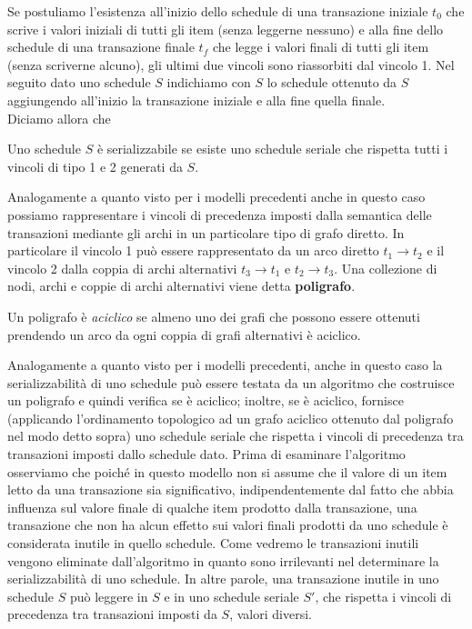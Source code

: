Se postuliamo l'esistenza all'inizio dello schedule di una transazione iniziale $t_0$ che scrive i valori
iniziali di tutti gli item (senza leggerne nessuno) e alla fine dello schedule di una transazione finale
$t_f$ che legge i valori finali di tutti gli item (senza scriverne alcuno), gli ultimi due vincoli sono
riassorbiti dal vincolo 1. Nel seguito dato uno schedule $S$ indichiamo con $S$ lo schedule ottenuto da
$S$ aggiungendo all'inizio la transazione iniziale e alla fine quella finale.\\

Diciamo allora che
\begin{defn}
 Uno schedule $S$ è serializzabile se esiste uno schedule seriale che rispetta tutti i
vincoli di tipo 1 e 2 generati da $S$.
\end{defn}

Analogamente a quanto visto per i modelli precedenti anche in questo caso possiamo rappresentare i
vincoli di precedenza imposti dalla semantica delle transazioni mediante gli archi in un particolare
tipo di grafo diretto. In particolare il vincolo 1 può essere rappresentato da un arco diretto $t_1\rightarrow t_2$ e
il vincolo 2 dalla coppia di archi alternativi $t_3\rightarrow t_1$ e $t_2\rightarrow t_3$. Una collezione di nodi, archi e
coppie di archi alternativi viene detta \textbf{poligrafo}.
\begin{defn}
Un poligrafo è \emph{aciclico} se almeno uno dei grafi che possono essere ottenuti prendendo un arco da 
ogni coppia di grafi alternativi è aciclico.
\end{defn}
Analogamente a quanto visto per i modelli precedenti, anche in questo caso la serializzabilità di uno
schedule può essere testata da un algoritmo che costruisce un poligrafo e quindi verifica se è
aciclico; inoltre, se è aciclico, fornisce (applicando l'ordinamento topologico ad un grafo aciclico
ottenuto dal poligrafo nel modo detto sopra) uno schedule seriale che rispetta i vincoli di
precedenza tra transazioni imposti dallo schedule dato. Prima di esaminare l'algoritmo osserviamo
che poiché in questo modello non si assume che il valore di un item letto da una transazione sia
significativo, indipendentemente dal fatto che abbia influenza sul valore finale di qualche item
prodotto dalla transazione, una transazione che non ha alcun effetto sui valori finali prodotti da uno
schedule è considerata inutile in quello schedule. Come vedremo le transazioni inutili vengono
eliminate dall'algoritmo in quanto sono irrilevanti nel determinare la serializzabilità di uno schedule.
In altre parole, una transazione inutile in uno schedule $S$ può leggere in $S$ e in uno schedule seriale
$S'$, che rispetta i vincoli di precedenza tra transazioni imposti da $S$, valori diversi.

